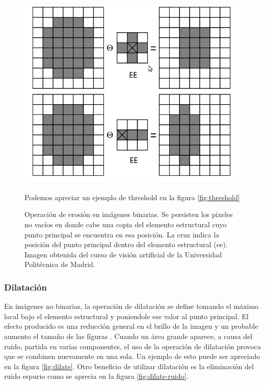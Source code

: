 \begin{figure}[tpb]
\begin{center}
  \includegraphics[scale=0.4]{figuras/erode-sample.png}
\end{center}Podemos apreciar un ejemplo de threshold en la figura \ref{fig:threshold}
  \caption{\small Operación de erosión en imágenes binarias. Se persisten los pixeles no vacíos en donde cabe una copia del elemento estructural cuyo punto principal se encuentra en esa posición. La cruz indica la posición del punto principal dentro del elemento estructural (ee). Imagen obtenida del curso de visión artificial de la Universidad Politécnica de Madrid. } 
  \label{fig:erode-sample}
\end{figure}

	\subsubsection*{Dilataci\'on}
En imágenes no binarias, la operación de dilatación se define tomando el máximo local bajo el elemento estructural y poniendole ese valor al punto principal. El efecto producido es una reducción general en el brillo de la imagen y un probable aumento el tamaño de las fíguras \cite{nasa-dilate-erode}.  Cuando un área grande aparece, a causa del ruido, partida en varias componentes, el uso de la operación de dilatación provoca que  se combinen nuevamente en una sola. Un ejemplo de esto puede ser apreciado en la figura \ref{fig:dilate}. Otro beneficio de utilizar dilatación es la eliminación del ruido espurio como se aprecia en la figura \ref{fig:dilate-ruido}.

